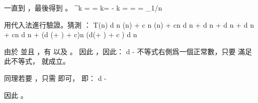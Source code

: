 一直到 ，最後得到 。
\startformula\startmathalignment
\NC \NC \alpha^k =  \NR
\NC \Rightarrow \NC {} = \log{} \NR
\NC \Rightarrow \NC k\log\alpha = -  \NR
\NC \Rightarrow \NC k =  =  = \log_{1/\alpha}n \NR
\stopmathalignment\stopformula

用代入法進行驗證。猜測 ：
\startformula\startmathalignment[n=3]
\NC T(n) \NC \le d \alpha n \lg(\alpha n) + c \beta n \lg(\beta n) + cn \NC \NR
\NC      \NC \le d \alpha n  + d \beta n  + d \alpha n \lg\alpha + d \beta n \lg\beta + cn \NC \NR
\NC      \NC \le d n  + \big(d (\alpha \lg\alpha + \beta \lg\beta) + c\big)n \NC (d(\alpha\lg\alpha + \beta\lg\beta) + c )\NR
\NC      \NC \le d n  \NC \NR
\stopmathalignment\stopformula

由於  並且 ，有  以及 。
因此 ，因此：
\startformula
d \ge -
\stopformula
不等式右側爲一個正常數，只要  滿足此不等式，  就成立。

同理若要 ，只需  即可，
即：
 \le d \le -
\stopformula

因此 。
\stopANSWER

\stopsection
